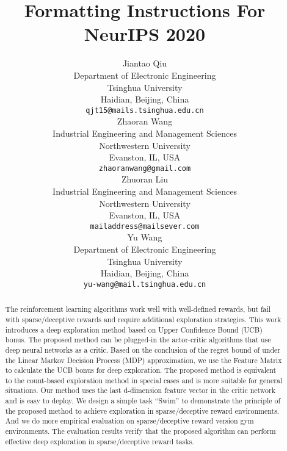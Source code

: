 \documentclass{article}
\title{Formatting Instructions For NeurIPS 2020}
\author{%
  Jiantao Qiu \\
  Department of Electronic Engineering\\
  Tsinghua University\\
  Haidian, Beijing, China\\
  \texttt{qjt15@mails.tsinghua.edu.cn} \\
   \And
   Zhaoran Wang \\
   Industrial Engineering and Management Sciences\\
    Northwestern University\\
    Evanston, IL, USA\\
   \texttt{zhaoranwang@gmail.com} \\
   \AND
   Zhuoran Liu \\
   Industrial Engineering and Management Sciences\\
    Northwestern University\\
    Evanston, IL, USA\\
   \texttt{mailaddress@mailsever.com} \\
  \And
  Yu Wang \\
  Department of Electronic Engineering\\
  Tsinghua University\\
  Haidian, Beijing, China\\
  \texttt{yu-wang@mail.tsinghua.edu.cn} \\
}
\begin{document}
\maketitle

\begin{abstract}
The reinforcement learning algorithms work well with well-defined rewards, but fail with sparse/deceptive rewards and require additional exploration strategies. This work introduces a deep exploration method based on Upper Confidence Bound (UCB) bonus. The proposed method can be plugged-in the actor-critic algorithms that use deep neural networks as a critic. Based on the conclusion of the regret bound of under the Linear Markov Decision Process (MDP) approximation, we use the Feature Matrix to calculate the UCB bonus for deep exploration. The proposed method is equivalent to the count-based exploration method in special cases and is more suitable for general situations. Our method uses the last d-dimension feature vector in the critic network and is easy to deploy. We design a simple task ``Swim'' to demonstrate the principle of the proposed method to achieve exploration in sparse/deceptive reward environments. And we do more empirical evaluation on sparse/deceptive reward version gym environments. The evaluation results verify that the proposed algorithm can perform effective deep exploration in sparse/deceptive reward tasks.
\end{abstract}











\end{document}
